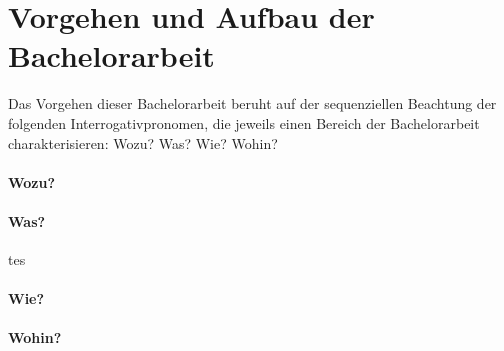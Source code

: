 \section{Vorgehen und Aufbau der Bachelorarbeit }\label{sec:Vorgehen}

Das Vorgehen dieser Bachelorarbeit beruht auf der sequenziellen Beachtung der folgenden Interrogativpronomen, die jeweils einen Bereich der Bachelorarbeit charakterisieren: Wozu? Was? Wie? Wohin?

\paragraph{Wozu?}

\paragraph{Was?}
tes


\paragraph{Wie?}

\paragraph{Wohin?}
